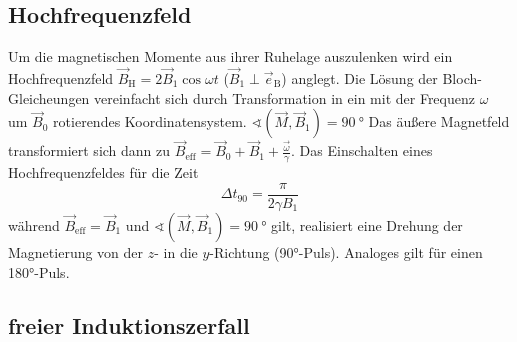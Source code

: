 \subsection{Hochfrequenzfeld}
\label{sec:Hochfrequenzfeld}

Um die magnetischen Momente aus ihrer Ruhelage auszulenken wird ein Hochfrequenzfeld  
$\vec{B}_{\text{H}} = 2 \vec{B}_{\text{1}} \cos{\omega t}$ ($\vec{B}_{\text{1}} 
\perp \vec{e}_{\text{B}}$) anglegt.
Die Lösung der Bloch-Gleicheungen vereinfacht sich durch Transformation 
in ein mit der Frequenz $\omega$ um $\vec{B}_{\text{0}}$ rotierendes 
Koordinatensystem. $\sphericalangle\!\left(\vec{M}, \vec{B}_1\right) = \SI{90}{\degree}$
Das äußere Magnetfeld transformiert sich dann zu 
$\vec{B}_\text{eff} = \vec{B}_0 + \vec{B}_1 + \frac{\vec{\omega}}{\gamma}$.
Das Einschalten eines Hochfrequenzfeldes für die Zeit 
\begin{equation}
    \Delta t_{\text{90}} = \frac{\pi}{2 \gamma B_{\text{1}}}
    \label{eq4}
\end{equation}
während $\vec{B}_{\text{eff}} = \vec{B}_{\text{1}}$ und 
$\sphericalangle\!\left(\vec{M}, \vec{B}_1\right) = \SI{90}{\degree}$ gilt, 
realisiert eine Drehung der Magnetierung von der $z$- in die $y$-Richtung
(90°-Puls). Analoges gilt für einen 180°-Puls.


\subsection{freier Induktionszerfall}
\label{sec:Induktionszerfall}


\cite{sample}
